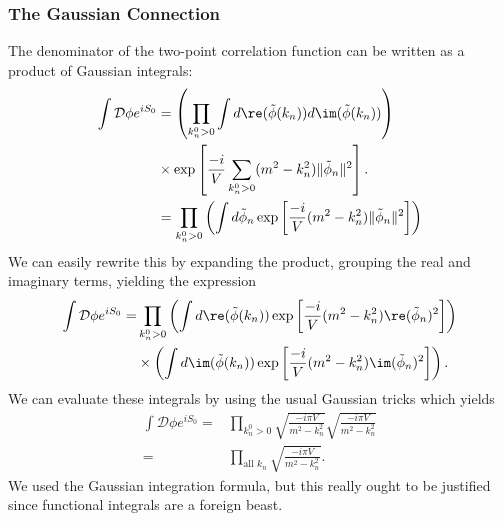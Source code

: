 \subsubsection{The Gaussian Connection} The denominator of the
two-point correlation function can be written as a product of
Gaussian integrals:
\begin{subequations}
\begin{align}
\int\mathcal{D}\phi e^{iS_{0}} &=
\left(\prod_{k_{n}^{0}>0}\int d\re(\tilde{\phi}(k_{n}))
d\im(\tilde{\phi}(k_{n}))\right)\nonumber\\
\;\;&\times\exp\left[\frac{-i}{V}\sum_{k^{0}_{n}>0}(m^{2}-k_{n}^{2})\|\tilde{\phi}_{n}\|^{2}\right].\\
&= \prod_{k^{0}_{n}>0}\left(\int d\tilde{\phi}_{n} \exp\left[\frac{-i}{V}(m^{2}-k_{n}^{2})\|\tilde{\phi}_{n}\|^{2}\right]\right)
\end{align}
\end{subequations}
We can easily rewrite this by expanding the product, grouping the
real and imaginary terms, yielding the expression
\begin{equation}
\begin{split}
\int\mathcal{D}\phi e^{iS_{0}} =&  \prod_{k^{0}_{n}>0} 
\left(\int d\re(\tilde{\phi}(k_{n}))\exp\left[\frac{-i}{V}(m^{2}-k_{n}^{2})\re(\tilde{\phi}_{n})^{2}\right]\right)\\
&\times
\left(\int d\im(\tilde{\phi}(k_{n}))\exp\left[\frac{-i}{V}(m^{2}-k_{n}^{2})\im(\tilde{\phi}_{n})^{2}\right]\right).
\end{split}
\end{equation}
We can evaluate these integrals by using the usual Gaussian
tricks which yields
\begin{subequations}\label{eq:functionalIntegralAsProductOfGaussians}
\begin{align}
\int\mathcal{D}\phi e^{iS_{0}} =& \prod_{k^{0}_{n}>0}\sqrt{\frac{-i\pi{V}}{m^{2}-k_{n}^{2}}}\sqrt{\frac{-i\pi{V}}{m^{2}-k_{n}^{2}}}\\
=& \prod_{\text{all } k_{n}}\sqrt{\frac{-i\pi{V}}{m^{2}-k_{n}^{2}}}.
\end{align}
\end{subequations}
We used the Gaussian integration formula, but this really ought
to be justified since functional integrals are a foreign beast.

